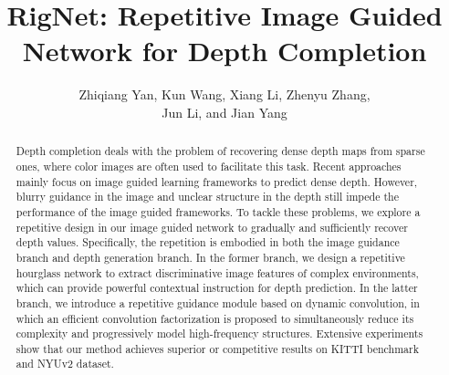 \documentclass[runningheads]{llncs}
\begin{document}
\pagestyle{headings}
\mainmatter

\title{RigNet: Repetitive Image Guided Network for Depth Completion}




\author{Zhiqiang Yan, Kun Wang, Xiang Li, Zhenyu Zhang, \\Jun Li\textsuperscript{\Letter}, and Jian Yang\textsuperscript{\Letter}}





\maketitle
\begin{abstract}
Depth completion deals with the problem of recovering dense depth maps from sparse ones, where color images are often used to facilitate this task. 
Recent approaches mainly focus on image guided learning frameworks to predict dense depth. However, blurry guidance in the image and unclear structure in the depth still impede the performance of the image guided frameworks. To tackle these problems, we explore a repetitive design in our image guided network to gradually and sufficiently recover depth values. Specifically, the repetition is embodied in both the image guidance branch and depth generation branch. In the former branch, we design a repetitive hourglass network to extract discriminative image features of complex environments, which can provide powerful contextual instruction for depth prediction. In the latter branch, we introduce a repetitive guidance module based on dynamic convolution, in which an efficient convolution factorization is proposed to simultaneously reduce its complexity and progressively model high-frequency structures. Extensive experiments show that our method achieves superior or competitive results on KITTI benchmark and NYUv2 dataset.
\end{abstract}
\end{document}
